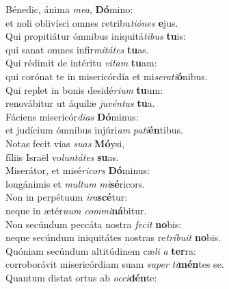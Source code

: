 \evenverse Bénedic, ánima \textit{me}\textit{a}, \textbf{Dó}mino:~\*\\
\evenverse et noli oblivísci omnes retribu\textit{ti}\textit{ó}\textit{nes} \textbf{e}jus.\\
\oddverse Qui propitiátur ómnibus iniquitá\textit{ti}\textit{bus} \textbf{tu}is:~\*\\
\oddverse qui sanat omnes infir\textit{mi}\textit{tá}\textit{tes} \textbf{tu}as.\\
\evenverse Qui rédimit de intéritu \textit{vi}\textit{tam} \textbf{tu}am:~\*\\
\evenverse qui corónat te in misericórdia et mi\textit{se}\textit{ra}\textit{ti}\textbf{ó}nibus.\\
\oddverse Qui replet in bonis desidé\textit{ri}\textit{um} \textbf{tu}um:~\*\\
\oddverse renovábitur ut áquilæ \textit{ju}\textit{vén}\textit{tus} \textbf{tu}a.\\
\evenverse Fáciens misericór\textit{di}\textit{as} \textbf{Dó}minus:~\*\\
\evenverse et judícium ómnibus injúri\textit{am} \textit{pa}\textit{ti}\textbf{én}tibus.\\
\oddverse Notas fecit vias \textit{su}\textit{as} \textbf{Mó}ysi,~\*\\
\oddverse fíliis Israël vo\textit{lun}\textit{tá}\textit{tes} \textbf{su}as.\\
\evenverse Miserátor, et misé\textit{ri}\textit{cors} \textbf{Dó}minus:~\*\\
\evenverse longánimis et \textit{mul}\textit{tum} \textit{mi}\textbf{sé}ricors.\\
\oddverse Non in perpétuum \textit{i}\textit{ra}\textbf{scé}tur:~\*\\
\oddverse neque in ætér\textit{num} \textit{com}\textit{mi}\textbf{ná}bitur.\\
\evenverse Non secúndum peccáta nostra \textit{fe}\textit{cit} \textbf{no}bis:~\*\\
\evenverse neque secúndum iniquitátes nostras re\textit{trí}\textit{bu}\textit{it} \textbf{no}bis.\\
\oddverse Quóniam secúndum altitúdinem cæ\textit{li} \textit{a} \textbf{ter}ra:~\*\\
\oddverse corroborávit misericórdiam suam \textit{su}\textit{per} \textit{ti}\textbf{mén}tes se.\\
\evenverse Quantum distat ortus ab \textit{oc}\textit{ci}\textbf{dén}te:~\*\\
